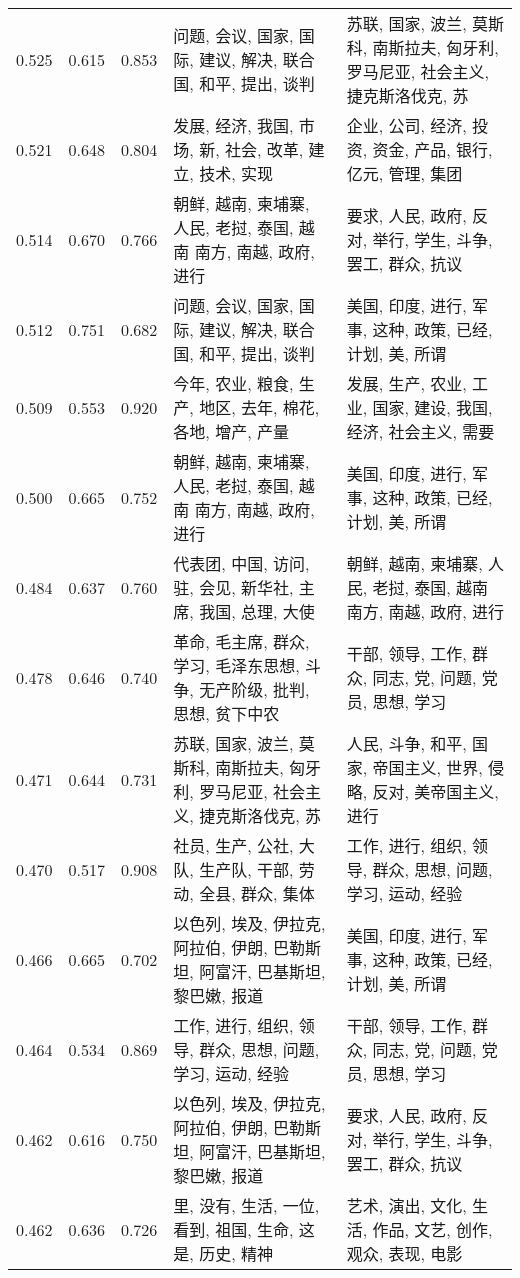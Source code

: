 \begin{tabular}{cccp{5cm}p{5cm}}
0.525 & 0.615 & 0.853 & 问题, 会议, 国家, 国际, 建议, 解决, 联合国, 和平, 提出, 谈判 & 苏联, 国家, 波兰, 莫斯科, 南斯拉夫, 匈牙利, 罗马尼亚, 社会主义, 捷克斯洛伐克, 苏 \\
0.521 & 0.648 & 0.804 & 发展, 经济, 我国, 市场, 新, 社会, 改革, 建立, 技术, 实现 & 企业, 公司, 经济, 投资, 资金, 产品, 银行, 亿元, 管理, 集团 \\
0.514 & 0.670 & 0.766 & 朝鲜, 越南, 柬埔寨, 人民, 老挝, 泰国, 越南 南方, 南越, 政府, 进行 & 要求, 人民, 政府, 反对, 举行, 学生, 斗争, 罢工, 群众, 抗议 \\
0.512 & 0.751 & 0.682 & 问题, 会议, 国家, 国际, 建议, 解决, 联合国, 和平, 提出, 谈判 & 美国, 印度, 进行, 军事, 这种, 政策, 已经, 计划, 美, 所谓 \\
0.509 & 0.553 & 0.920 & 今年, 农业, 粮食, 生产, 地区, 去年, 棉花, 各地, 增产, 产量 & 发展, 生产, 农业, 工业, 国家, 建设, 我国, 经济, 社会主义, 需要 \\
0.500 & 0.665 & 0.752 & 朝鲜, 越南, 柬埔寨, 人民, 老挝, 泰国, 越南 南方, 南越, 政府, 进行 & 美国, 印度, 进行, 军事, 这种, 政策, 已经, 计划, 美, 所谓 \\
0.484 & 0.637 & 0.760 & 代表团, 中国, 访问, 驻, 会见, 新华社, 主席, 我国, 总理, 大使 & 朝鲜, 越南, 柬埔寨, 人民, 老挝, 泰国, 越南 南方, 南越, 政府, 进行 \\
0.478 & 0.646 & 0.740 & 革命, 毛主席, 群众, 学习, 毛泽东思想, 斗争, 无产阶级, 批判, 思想, 贫下中农 & 干部, 领导, 工作, 群众, 同志, 党, 问题, 党员, 思想, 学习 \\
0.471 & 0.644 & 0.731 & 苏联, 国家, 波兰, 莫斯科, 南斯拉夫, 匈牙利, 罗马尼亚, 社会主义, 捷克斯洛伐克, 苏 & 人民, 斗争, 和平, 国家, 帝国主义, 世界, 侵略, 反对, 美帝国主义, 进行 \\
0.470 & 0.517 & 0.908 & 社员, 生产, 公社, 大队, 生产队, 干部, 劳动, 全县, 群众, 集体 & 工作, 进行, 组织, 领导, 群众, 思想, 问题, 学习, 运动, 经验 \\
0.466 & 0.665 & 0.702 & 以色列, 埃及, 伊拉克, 阿拉伯, 伊朗, 巴勒斯坦, 阿富汗, 巴基斯坦, 黎巴嫩, 报道 & 美国, 印度, 进行, 军事, 这种, 政策, 已经, 计划, 美, 所谓 \\
0.464 & 0.534 & 0.869 & 工作, 进行, 组织, 领导, 群众, 思想, 问题, 学习, 运动, 经验 & 干部, 领导, 工作, 群众, 同志, 党, 问题, 党员, 思想, 学习 \\
0.462 & 0.616 & 0.750 & 以色列, 埃及, 伊拉克, 阿拉伯, 伊朗, 巴勒斯坦, 阿富汗, 巴基斯坦, 黎巴嫩, 报道 & 要求, 人民, 政府, 反对, 举行, 学生, 斗争, 罢工, 群众, 抗议 \\
0.462 & 0.636 & 0.726 & 里, 没有, 生活, 一位, 看到, 祖国, 生命, 这是, 历史, 精神 & 艺术, 演出, 文化, 生活, 作品, 文艺, 创作, 观众, 表现, 电影 \\

\end{tabular}
